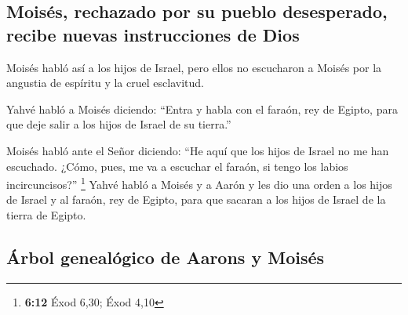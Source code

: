 \begin{paracol}{2}
\hypertarget{moisuxe9s-rechazado-por-su-pueblo-desesperado-recibe-nuevas-instrucciones-de-dios}{%
\subsection{Moisés, rechazado por su pueblo desesperado, recibe nuevas
instrucciones de
Dios}\label{moisuxe9s-rechazado-por-su-pueblo-desesperado-recibe-nuevas-instrucciones-de-dios}}

 Moisés habló así a los hijos de Israel, pero ellos no
escucharon a Moisés por la angustia de espíritu y la cruel esclavitud.

 Yahvé habló a Moisés diciendo:  ``Entra y
habla con el faraón, rey de Egipto, para que deje salir a los hijos de
Israel de su tierra.''

 Moisés habló ante el Señor diciendo: ``He aquí que los
hijos de Israel no me han escuchado. ¿Cómo, pues, me va a escuchar el
faraón, si tengo los labios incircuncisos?'' \footnote{\textbf{6:12}
  Éxod 6,30; Éxod 4,10}  Yahvé habló a Moisés y a Aarón y
les dio una orden a los hijos de Israel y al faraón, rey de Egipto, para
que sacaran a los hijos de Israel de la tierra de Egipto.

\hypertarget{uxe1rbol-genealuxf3gico-de-aarons-y-moisuxe9s}{%
\subsection{Árbol genealógico de Aarons y
Moisés}\label{uxe1rbol-genealuxf3gico-de-aarons-y-moisuxe9s}}


\end{paracol}
